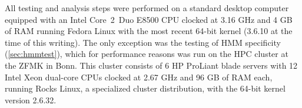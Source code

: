 All testing and analysis steps were performed on a standard desktop computer
equipped with an Intel \mbox{Core 2 Duo} E8500 CPU clocked at 3.16 GHz and 4 GB
of RAM running Fedora Linux with the most recent 64-bit kernel (3.6.10 at the
time of this writing). The only exception was the testing of HMM specificity
(\ref{sec:hmmtest}), which for performance reasons was run on the HPC cluster at
the ZFMK in Bonn. This cluster consists of 6 HP ProLiant blade servers with 12
Intel Xeon dual-core CPUs clocked at 2.67 GHz and 96 GB of RAM each, running
Rocks Linux, a specialized cluster distribution, with the 64-bit kernel version
2.6.32.

